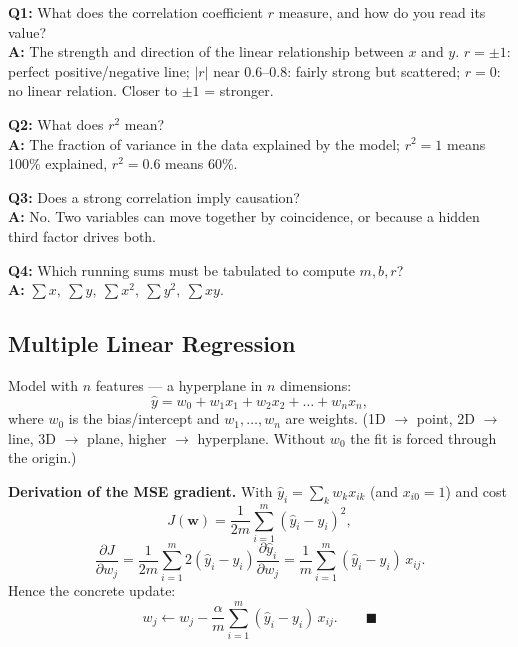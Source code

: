 \begin{qabox}
\textbf{Q1:} What does the correlation coefficient $r$ measure, and how do you read its value? \\
\textbf{A:} The strength and direction of the linear relationship between $x$ and $y$. $r=\pm1$: perfect positive/negative line; $|r|$ near $0.6$–$0.8$: fairly strong but scattered; $r=0$: no linear relation. Closer to $\pm1$ = stronger.

\textbf{Q2:} What does $r^2$ mean? \\
\textbf{A:} The fraction of variance in the data explained by the model; $r^2=1$ means 100\% explained, $r^2=0.6$ means 60\%.

\textbf{Q3:} Does a strong correlation imply causation? \\
\textbf{A:} No. Two variables can move together by coincidence, or because a hidden third factor drives both.

\textbf{Q4:} Which running sums must be tabulated to compute $m,b,r$? \\
\textbf{A:} $\sum x,\ \sum y,\ \sum x^2,\ \sum y^2,\ \sum xy$.
\end{qabox}

\subsection{Multiple Linear Regression}

\begin{defbox}
Model with $n$ features — a hyperplane in $n$ dimensions:
\[
\hat y = w_0 + w_1x_1+w_2x_2+\dots+w_nx_n,
\]
where $w_0$ is the bias/intercept and $w_1,\dots,w_n$ are weights. (1D $\to$ point, 2D $\to$ line, 3D $\to$ plane, higher $\to$ hyperplane. Without $w_0$ the fit is forced through the origin.)
\end{defbox}

\begin{examplebox}
\textbf{Derivation of the MSE gradient.} With $\hat y_i = \sum_k w_k x_{ik}$ (and $x_{i0}=1$) and cost
\[
J(\mathbf w) = \frac{1}{2m}\sum_{i=1}^m (\hat y_i-y_i)^2,
\]
\[
\frac{\partial J}{\partial w_j} = \frac{1}{2m}\sum_{i=1}^m 2(\hat y_i-y_i)\frac{\partial \hat y_i}{\partial w_j} = \frac{1}{m}\sum_{i=1}^m (\hat y_i-y_i)\,x_{ij}.
\]
Hence the concrete update:
\[
w_j \leftarrow w_j - \frac{\alpha}{m}\sum_{i=1}^m (\hat y_i-y_i)\,x_{ij}. \qquad\blacksquare
\]
\end{examplebox}

